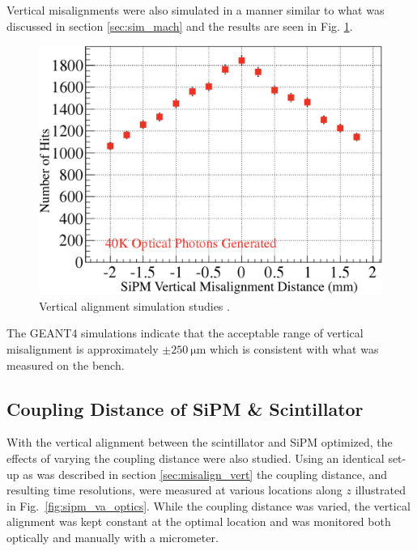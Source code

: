 Vertical misalignments were also simulated in a manner similar to what was discussed in section \ref{sec:sim_mach} and the results are seen in Fig. \ref{fig:vertical_sim}.
	\begin{figure}[!htb]
		\centering
		\includegraphics[width=1.0\columnwidth]{misalignment/figs/vertical_sim}
		\caption{Vertical alignment simulation studies \cite{puneet_sim_talk}.}
		\label{fig:vertical_sim}
	\end{figure}
The GEANT4 simulations indicate that the acceptable range of vertical misalignment is approximately $\pm 250\ \mathrm{\mu m}$ \cite{puneet_sim_talk} which is consistent with what was measured on the bench.

\subsection{Coupling Distance of SiPM \& Scintillator}

With the vertical alignment between the scintillator and SiPM optimized, the effects of varying the coupling distance were also studied.  Using an identical set-up as was described in section \ref{sec:misalign_vert} the coupling distance, and resulting time resolutions, were measured at various locations along $z$ illustrated in Fig.~\ref{fig:sipm_va_optics}.  While the coupling distance was varied, the vertical alignment was kept constant at the optimal location and was monitored both optically and manually with a micrometer.


